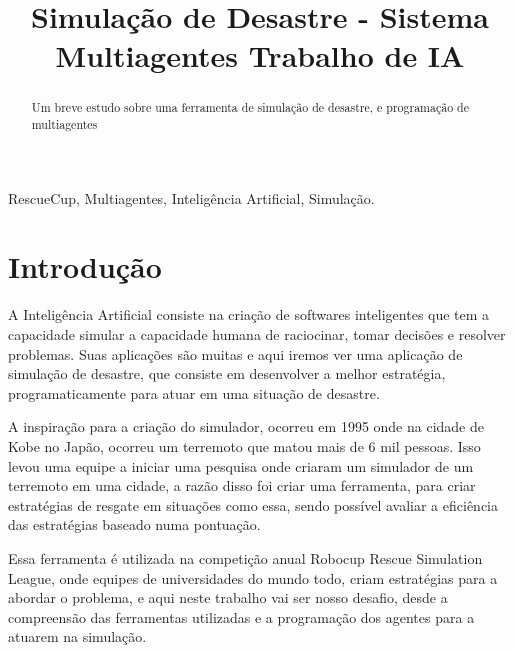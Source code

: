 \documentclass[conference]{IEEEtran}
\begin{document}
\title{Simulação de Desastre - Sistema Multiagentes  Trabalho de IA\\
}

\author{
}

\maketitle

\begin{abstract}
Um breve estudo sobre uma ferramenta de simulação de desastre, e programação de multiagentes
\end{abstract}

\begin{IEEEkeywords}
RescueCup, Multiagentes, Inteligência Artificial, Simulação.
\end{IEEEkeywords}

\section{Introdução}
A Inteligência Artificial consiste na criação de softwares inteligentes que tem a capacidade simular a capacidade humana de raciocinar, tomar decisões e resolver problemas. Suas aplicações são muitas e aqui iremos ver uma aplicação de simulação de desastre, que consiste em desenvolver a melhor estratégia, programaticamente para atuar em uma situação de desastre.

A inspiração para a criação do simulador, ocorreu em 1995 onde na cidade de Kobe no Japão, ocorreu um terremoto que matou mais de 6 mil pessoas. Isso levou uma equipe a iniciar uma pesquisa onde criaram um simulador de um terremoto em uma cidade, a razão disso foi criar uma ferramenta, para criar estratégias de resgate em situações como essa, sendo possível avaliar a eficiência das estratégias baseado numa pontuação.

Essa ferramenta é utilizada na competição anual Robocup Rescue Simulation League, onde equipes de universidades do mundo todo, criam estratégias para  a abordar o problema, e aqui neste trabalho vai ser nosso desafio, desde a compreensão das ferramentas utilizadas e a programação dos agentes para a atuarem na simulação.
\end{document}

